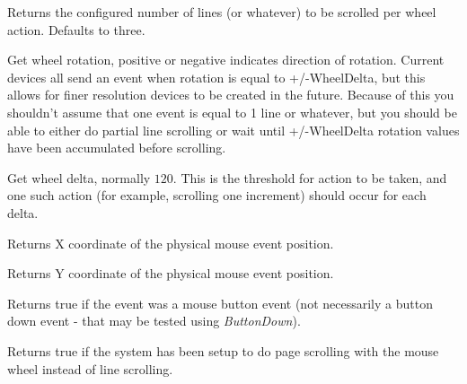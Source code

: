 
Returns the configured number of lines (or whatever) to be scrolled per
wheel action.  Defaults to three.

\label{wxmouseeventgetwheelrotation}


Get wheel rotation, positive or negative indicates direction of
rotation.  Current devices all send an event when rotation is equal to
+/-WheelDelta, but this allows for finer resolution devices to be
created in the future.  Because of this you shouldn't assume that one
event is equal to 1 line or whatever, but you should be able to either
do partial line scrolling or wait until +/-WheelDelta rotation values
have been accumulated before scrolling.

\label{wxmouseeventgetwheeldelta}


Get wheel delta, normally $120$.  This is the threshold for action to be
taken, and one such action (for example, scrolling one increment)
should occur for each delta.

\label{wxmouseeventgetx}


Returns X coordinate of the physical mouse event position.

\label{wxmouseeventgety}


Returns Y coordinate of the physical mouse event position.



Returns true if the event was a mouse button event (not necessarily a button down event -
that may be tested using {\it ButtonDown}).



Returns true if the system has been setup to do page scrolling with
the mouse wheel instead of line scrolling.

\label{wxmouseeventleaving}


